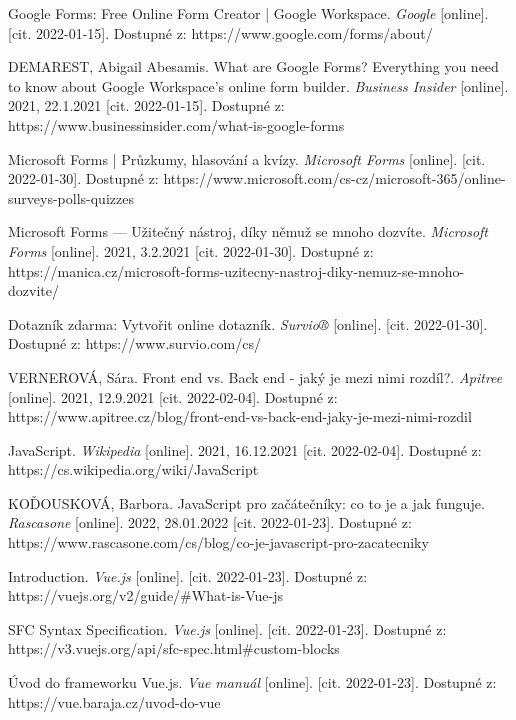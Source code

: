\begin{thebibliography}{50}

Google Forms: Free Online Form Creator | Google Workspace. \textit{Google} [online]. [cit. 2022-01-15]. Dostupné z: https://www.google.com/forms/about/

DEMAREST, Abigail Abesamis. What are Google Forms? Everything you need to know about Google Workspace's online form builder. \textit{Business Insider} [online]. 2021, 22.1.2021 [cit. 2022-01-15]. Dostupné z: https://www.businessinsider.com/what-is-google-forms

Microsoft Forms | Průzkumy, hlasování a kvízy. \textit{Microsoft Forms} [online]. [cit. 2022-01-30]. Dostupné z: https://www.microsoft.com/cs-cz/microsoft-365/online-surveys-polls-quizzes

Microsoft Forms --- Užitečný nástroj, díky němuž se mnoho dozvíte. \textit{Microsoft Forms} [online]. 2021, 3.2.2021 [cit. 2022-01-30]. Dostupné z: https://manica.cz/microsoft-forms-uzitecny-nastroj-diky-nemuz-se-mnoho-dozvite/

Dotazník zdarma: Vytvořit online dotazník. \textit{Survio®} [online]. [cit. 2022-01-30]. Dostupné z: https://www.survio.com/cs/

VERNEROVÁ, Sára. Front end vs. Back end - jaký je mezi nimi rozdíl?. \textit{Apitree} [online]. 2021, 12.9.2021 [cit. 2022-02-04]. Dostupné z: https://www.apitree.cz/blog/front-end-vs-back-end-jaky-je-mezi-nimi-rozdil

JavaScript. \textit{Wikipedia} [online]. 2021, 16.12.2021 [cit. 2022-02-04]. Dostupné z: https://cs.wikipedia.org/wiki/JavaScript

KOĎOUSKOVÁ, Barbora. JavaScript pro začátečníky: co to je a jak funguje. \textit{Rascasone} [online]. 2022, 28.01.2022 [cit. 2022-01-23]. Dostupné z: https://www.rascasone.com/cs/blog/co-je-javascript-pro-zacatecniky

Introduction. \textit{Vue.js} [online]. [cit. 2022-01-23]. Dostupné z: https://vuejs.org/v2/guide/\#What-is-Vue-js

SFC Syntax Specification. \textit{Vue.js} [online]. [cit. 2022-01-23]. Dostupné z: https://v3.vuejs.org/api/sfc-spec.html\#custom-blocks

Úvod do frameworku Vue.js. \textit{Vue manuál} [online]. [cit. 2022-01-23]. Dostupné z: https://vue.baraja.cz/uvod-do-vue


\end{thebibliography}
